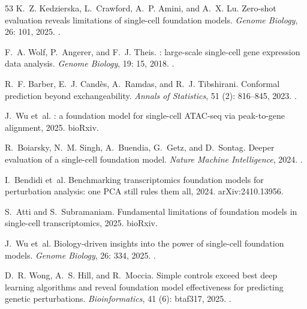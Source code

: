 \documentclass[fleqn,10pt,lineno]{wlpeerj}  %
\begin{document}
\begin{thebibliography}{53}
K.~Z. Kedzierska, L.~Crawford, A.~P. Amini, and A.~X. Lu.
\newblock Zero-shot evaluation reveals limitations of single-cell foundation
  models.
\newblock \emph{Genome Biology}, 26: 101, 2025.
\newblock {}.

F.~A. Wolf, P.~Angerer, and F.~J. Theis.
: large-scale single-cell gene expression data analysis.
\newblock \emph{Genome Biology}, 19: 15, 2018.
\newblock {}.

R.~F. Barber, E.~J. Cand{\`e}s, A.~Ramdas, and R.~J. Tibshirani.
\newblock Conformal prediction beyond exchangeability.
\newblock \emph{Annals of Statistics}, 51 (2): 816--845,
  2023.
\newblock {}.

J.~Wu et~al.
: a foundation model for single-cell {ATAC}-seq via
  peak-to-gene alignment, 2025{}.
\newblock bioRxiv.

R.~Boiarsky, N.~M. Singh, A.~Buendia, G.~Getz, and D.~Sontag.
\newblock Deeper evaluation of a single-cell foundation model.
\newblock \emph{Nature Machine Intelligence}, 2024.
\newblock {}.

I.~Bendidi et~al.
\newblock Benchmarking transcriptomics foundation models for perturbation
  analysis: one {PCA} still rules them all, 2024.
\newblock arXiv:2410.13956.

S.~Atti and S.~Subramaniam.
\newblock Fundamental limitations of foundation models in single-cell
  transcriptomics, 2025.
\newblock bioRxiv.

J.~Wu et~al.
\newblock Biology-driven insights into the power of single-cell foundation
  models.
\newblock \emph{Genome Biology}, 26: 334, 2025{}.
\newblock {}.

D.~R. Wong, A.~S. Hill, and R.~Moccia.
\newblock Simple controls exceed best deep learning algorithms and reveal
  foundation model effectiveness for predicting genetic perturbations.
\newblock \emph{Bioinformatics}, 41 (6): btaf317, 2025.
\newblock {}.


\end{thebibliography}
\end{document}
